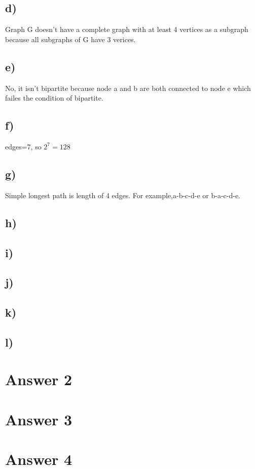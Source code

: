 \documentclass[12pt]{article}
\begin{document}
\subsection*{d)}
Graph G doesn't have a complete graph with at least 4 vertices as a subgraph because all subgraphs of G have 3 verices. \\
\subsection*{e)}
No, it isn't bipartite because node a and b are both connected to node e which failes the condition of bipartite.\\
\subsection*{f)}
edges=7, so $2^7=128$\\
\subsection*{g)}
Simple longest path is length of 4 edges. For example,a-b-c-d-e or b-a-c-d-e.\\
\subsection*{h)}


\subsection*{i)}
\subsection*{j)}
\subsection*{k)}
\subsection*{l)}

\section*{Answer 2}


\section*{Answer 3}


\section*{Answer 4}
\end{document}

